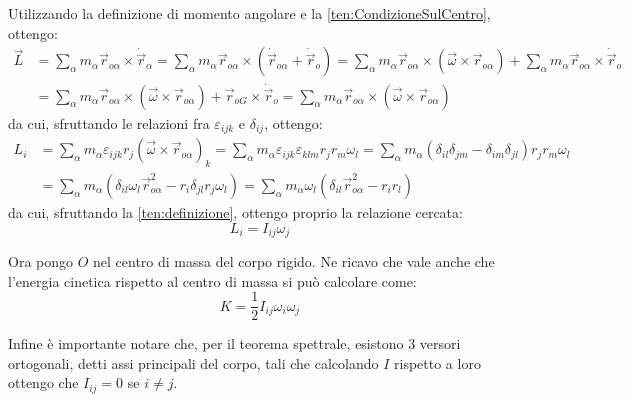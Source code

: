 \documentclass[../main.tex]{subfiles}
\begin{document}
Utilizzando la definizione di momento angolare e la \cref{ten:CondizioneSulCentro}, ottengo:
\begin{equation*}
	\begin{split}
	\vec L	& =\sum_{\alpha} m_\alpha \vec r_{o\alpha}\times \dot{\vec r}_{\alpha}=\sum_{\alpha} m_\alpha \vec r_{o\alpha}\times (\dot{\vec r}_{o\alpha}+\dot{\vec r}_o)=\sum_{\alpha} m_\alpha \vec r_{o\alpha}\times (\vec\omega\times\vec r_{o\alpha})+\sum_{\alpha} m_\alpha \vec r_{o\alpha}\times \dot{\vec r}_o\\
			& =\sum_{\alpha} m_\alpha \vec r_{o\alpha}\times (\vec\omega\times\vec r_{o\alpha})+\vec r_{oG}\times \dot{\vec r}_o=\sum_{\alpha} m_\alpha \vec r_{o\alpha}\times (\vec\omega\times\vec r_{o\alpha})
	\end{split}
\end{equation*}
da cui, sfruttando le relazioni fra $\varepsilon_{ijk}$ e $\delta_{ij}$, ottengo:
\begin{equation*}
	\begin{split}
		L_i & =\sum_\alpha m_\alpha \varepsilon_{ijk}r_j(\vec\omega\times\vec{r}_{o\alpha})_k = \sum_\alpha m_\alpha \varepsilon_{ijk} \varepsilon_{klm} r_j r_m\omega_l =\sum_\alpha m_\alpha (\delta_{il}\delta_{jm}-\delta_{im}\delta_{jl}) r_j r_m\omega_l \\
			& =\sum_\alpha m_\alpha (\delta_{il}\omega_l\vec r_{o\alpha}^2 -r_i\delta_{jl} r_j\omega_l)=\sum_\alpha m_\alpha \omega_l(\delta_{il}\vec r_{o\alpha}^2 -r_ir_l)
	\end{split}
\end{equation*}
da cui, sfruttando la \cref{ten:definizione}, ottengo proprio la relazione cercata:
\begin{equation}\label{ten:MomentoAngolare}
	L_i=I_{ij}\omega_j
\end{equation}

Ora pongo $O$ nel centro di massa del corpo rigido. Ne ricavo che vale anche che l'energia cinetica rispetto al centro di massa si può calcolare come:
\begin{equation} \label{ten:EnergiaCinetica}
	K=\frac 12 I_{ij}\omega_i\omega_j
\end{equation}

Infine è importante notare che, per il teorema spettrale, esistono 3 versori ortogonali, detti assi principali del corpo, tali che calcolando $I$ rispetto a loro ottengo che $I_{ij}=0$ se $i\not=j$.
\end{document}
